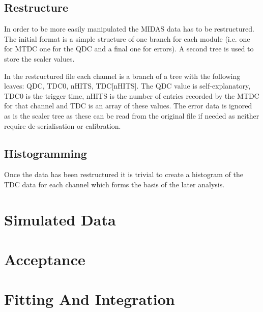 \documentclass[]{article}
\begin{document}
\subsection{Restructure} %
\label{sub:restructure}
In order to be more easily manipulated the MIDAS data has to be restructured. The initial format is a simple structure of one branch for each module (i.e. one for MTDC one for the QDC and a final one for errors). A second tree is used to store the scaler values. 

In the restructured file each channel is a branch of a tree with the following leaves: QDC, TDC0, nHITS, TDC[nHITS]. The QDC value is self-explanatory, TDC0 is the trigger time, nHITS is the number of entries recorded by the MTDC for that channel and TDC is an array of these values. The error data is ignored as is the scaler tree as these can be read from the original file if needed as neither require de-serialisation or calibration.
\subsection{Histogramming} %
\label{sub:Histogramming}
Once the data has been restructured it is trivial to create a histogram of the TDC data for each channel which forms the basis of the later analysis.
\section{Simulated Data} %
\label{sec:simulated_data}

\section{Acceptance} %
\label{sec:acceptance}

\section{Fitting And Integration} %
\label{sec:fitting_and_integration}

\end{document}
